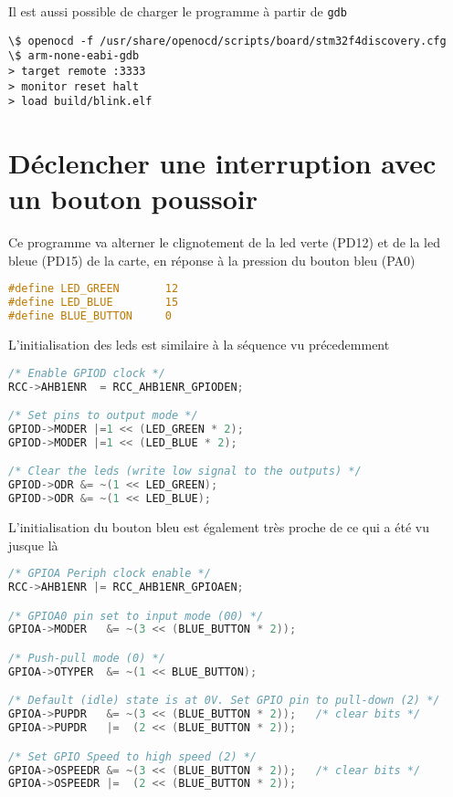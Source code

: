 \documentclass[12pt]{article}
\begin{document}
Il est aussi possible de charger le programme à partir de \texttt{gdb}

\begin{lstlisting}
\$ openocd -f /usr/share/openocd/scripts/board/stm32f4discovery.cfg
\$ arm-none-eabi-gdb
> target remote :3333
> monitor reset halt
> load build/blink.elf
\end{lstlisting}

\section{Déclencher une interruption avec un bouton poussoir}

Ce programme va alterner le clignotement de la led verte (PD12) et de la led bleue (PD15) de la carte, en réponse à la pression du bouton bleu (PA0)

\begin{lstlisting}[language=C]
#define LED_GREEN       12
#define LED_BLUE        15
#define BLUE_BUTTON     0
\end{lstlisting}

L'initialisation des leds est similaire à la séquence vu précedemment 

\begin{lstlisting}[language=C]
/* Enable GPIOD clock */
RCC->AHB1ENR  = RCC_AHB1ENR_GPIODEN;

/* Set pins to output mode */
GPIOD->MODER |=1 << (LED_GREEN * 2);
GPIOD->MODER |=1 << (LED_BLUE * 2);

/* Clear the leds (write low signal to the outputs) */
GPIOD->ODR &= ~(1 << LED_GREEN);
GPIOD->ODR &= ~(1 << LED_BLUE);
\end{lstlisting}

L'initialisation du bouton bleu est également très proche de ce qui a été vu jusque là

\begin{lstlisting}[language=C]
/* GPIOA Periph clock enable */
RCC->AHB1ENR |= RCC_AHB1ENR_GPIOAEN;

/* GPIOA0 pin set to input mode (00) */
GPIOA->MODER   &= ~(3 << (BLUE_BUTTON * 2));

/* Push-pull mode (0) */
GPIOA->OTYPER  &= ~(1 << BLUE_BUTTON);

/* Default (idle) state is at 0V. Set GPIO pin to pull-down (2) */
GPIOA->PUPDR   &= ~(3 << (BLUE_BUTTON * 2));   /* clear bits */
GPIOA->PUPDR   |=  (2 << (BLUE_BUTTON * 2));

/* Set GPIO Speed to high speed (2) */
GPIOA->OSPEEDR &= ~(3 << (BLUE_BUTTON * 2));   /* clear bits */
GPIOA->OSPEEDR |=  (2 << (BLUE_BUTTON * 2));
\end{lstlisting}
\end{document}
